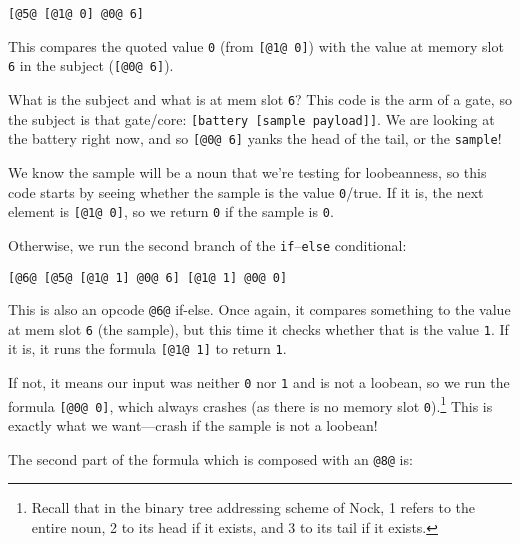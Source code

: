 \documentclass[twoside]{article}
\begin{document}
\begin{lstlisting}[style=listingblock]
[@5@ [@1@ 0] @0@ 6]
\end{lstlisting}

\noindent
This compares the quoted value \lstinline[style=inlinecode]{0} (from \lstinline[style=inlinecode]{[@1@ 0]}) with the value at memory slot \lstinline[style=inlinecode]{6} in the subject (\lstinline[style=inlinecode]{[@0@ 6]}).

What is the subject and what is at mem slot \lstinline[style=inlinecode]{6}? This code is the arm of a gate, so the subject is that gate/core: \lstinline[style=inlinecode]{[battery [sample payload]]}. We are looking at the battery right now, and so \lstinline[style=inlinecode]{[@0@ 6]} yanks the head of the tail, or the \lstinline[style=inlinecode]{sample}!

We know the sample will be a noun that we're testing for loobeanness, so this code starts by seeing whether the sample is the value \lstinline[style=inlinecode]{0}/true. If it is, the next element is \lstinline[style=inlinecode]{[@1@ 0]}, so we return \lstinline[style=inlinecode]{0} if the sample is \lstinline[style=inlinecode]{0}.

Otherwise, we run the second branch of the \lstinline[style=inlinecode]{if}–\lstinline[style=inlinecode]{else} conditional:

\begin{lstlisting}[style=listingblock]
[@6@ [@5@ [@1@ 1] @0@ 6] [@1@ 1] @0@ 0]
\end{lstlisting}

This is also an opcode \lstinline[style=inlinecode]{@6@} if-else. Once again, it compares something to the value at mem slot \lstinline[style=inlinecode]{6} (the sample), but this time it checks whether that is the value \lstinline[style=inlinecode]{1}. If it is, it runs the formula \lstinline[style=inlinecode]{[@1@ 1]} to return \lstinline[style=inlinecode]{1}.

If not, it means our input was neither \lstinline[style=inlinecode]{0} nor \lstinline[style=inlinecode]{1} and is not a loobean, so we run the formula \lstinline[style=inlinecode]{[@0@ 0]}, which always crashes (as there is no memory slot \lstinline[style=inlinecode]{0}).\footnote{Recall that in the binary tree addressing scheme of Nock, 1 refers to the entire noun, 2 to its head if it exists, and 3 to its tail if it exists.} This is exactly what we want—crash if the sample is not a loobean!

The second part of the formula which is composed with an \lstinline[style=inlinecode]{@8@} is:
\end{document}
